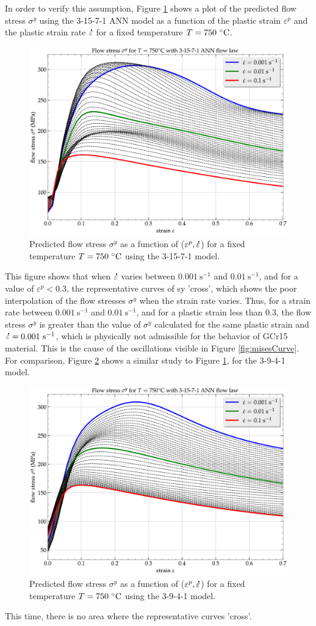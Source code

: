 \documentclass[algorithms,article,submit,pdftex,moreauthors]{Definitions/mdpi}
\DeclareRobustCommand{\mdot}[1]{\accentset{\mbox{\bfseries .}}{#1}}
\DeclareRobustCommand{\ps}{\text{s}^{-1}}
\begin{document}
In order to verify this assumption, Figure \ref{fig:ShapeOF1} shows a plot of the predicted flow stress $\sigma^y$ using the 3-15-7-1 ANN model as a function of the plastic strain $\varepsilon^p$ and the plastic strain rate $\mdot\varepsilon$ for a fixed temperature $T=750~\celsius$.
\begin{figure}[!ht]
\centering
\includegraphics[width=0.75\columnwidth]{Figures/Shape-3-15-7-1}
\caption{Predicted flow stress $\sigma^y$ as a function of ($\varepsilon^p, \mdot\varepsilon$) for a fixed temperature $T=750~\celsius$ using the 3-15-7-1 model.}
\label{fig:ShapeOF1}
\end{figure}
This figure shows that when $\mdot\varepsilon$ varies between $0.001~\ps$ and $0.01~\ps$, and for a value of $\varepsilon^p<0.3$, the representative curves of sy 'cross', which shows the poor interpolation of the flow stresses $\sigma^y$ when the strain rate varies.
Thus, for a strain rate between $0.001~\ps$ and $0.01~\ps$, and for a plastic strain less than $0.3$, the flow stress $\sigma^y$ is greater than the value of $\sigma^y$ calculated for the same plastic strain and $\mdot\varepsilon=0.001~\ps$, which is physically not admissible for the behavior of GCr15 material.
This is the cause of the oscillations visible in Figure \ref{fig:misesCurve}.
For comparison, Figure \ref{fig:ShapeOF2} shows a similar study to Figure \ref{fig:ShapeOF1}, for the 3-9-4-1 model.
\begin{figure}[!ht]
\centering
\includegraphics[width=0.75\columnwidth]{Figures/Shape-3-9-4-1}
\caption{Predicted flow stress $\sigma^y$ as a function of ($\varepsilon^p, \mdot\varepsilon$) for a fixed temperature $T=750~\celsius$ using the 3-9-4-1 model.}
\label{fig:ShapeOF2}
\end{figure}
This time, there is no area where the representative curves 'cross'.
\end{document}
